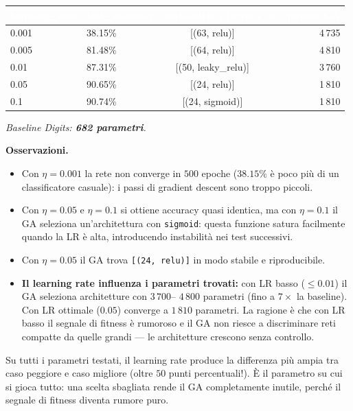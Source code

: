 \documentclass[11pt,a4paper]{article}
\newcommand{\fnt}{\texttt}     %
\begin{document}
\begin{center}
\begin{tabular}{llcr}
    \toprule
    \rowcolor{headerblue}
    \textcolor{white}{\textbf{learning\_rate}} &
    \textcolor{white}{\textbf{test\_accuracy}} &
    \textcolor{white}{\textbf{architettura trovata}} &
    \textcolor{white}{\textbf{n\_params GA}} \\
    \midrule
    0.001  & 38.15\%  & [(63, relu)]        & 4\,735 \\
    \rowcolor{rowgray}
    0.005  & 81.48\%  & [(64, relu)]        & 4\,810 \\
    0.01   & 87.31\%  & [(50, leaky\_relu)] & 3\,760 \\
    \rowcolor{rowgray}
    0.05   & 90.65\%  & [(24, relu)]        & 1\,810 \\
    0.1    & 90.74\%  & [(24, sigmoid)]     & 1\,810 \\
    \bottomrule
\end{tabular}
\end{center}

\textit{Baseline Digits: \textbf{682 parametri}.}

\textbf{Osservazioni.}
\begin{itemize}
    \item Con $\eta = 0.001$ la rete non converge in $500$ epoche
          ($38.15\%$ è poco più di un classificatore casuale): i passi di
          gradient descent sono troppo piccoli.
    \item Con $\eta = 0.05$ e $\eta = 0.1$ si ottiene accuracy quasi
          identica, ma con $\eta=0.1$ il GA seleziona un'architettura con
          \fnt{sigmoid}: questa funzione satura facilmente quando la LR è
          alta, introducendo instabilità nei test successivi.
    \item Con $\eta = 0.05$ il GA trova \fnt{[(24, relu)]} in modo stabile
          e riproducibile.
    \item \textbf{Il learning rate influenza i parametri trovati:} con LR
          basso ($\le 0.01$) il GA seleziona architetture con $3\,700$--
          $4\,800$ parametri (fino a $7\times$ la baseline). Con LR
          ottimale ($0.05$) converge a $1\,810$ parametri. La ragione è
          che con LR basso il segnale di fitness è rumoroso e il GA non
          riesce a discriminare reti compatte da quelle grandi --- le
          architetture crescono senza controllo.
\end{itemize}

\begin{concetto}
Su tutti i parametri testati, il learning rate produce la differenza più
ampia tra caso peggiore e caso migliore (oltre $50$ punti percentuali!).
È il parametro su cui si gioca tutto: una scelta sbagliata rende il GA
completamente inutile, perché il segnale di fitness diventa rumore puro.
\end{concetto}
\end{document}

